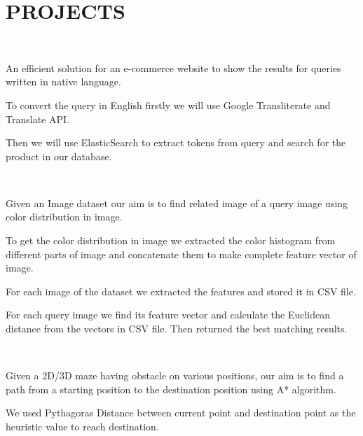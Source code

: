 \documentclass[]{deedy-resume-openfont}
\begin{document}
\begin{minipage}[t]{0.66\textwidth} 


\section{PROJECTS}
\sectionsep
{}\\
\vspace{\topsep} %
\sectionsep
\begin{tightemize}
\item \textmd{An efficient solution for an e-commerce website to show the results for queries written in native language.}
\item \textmd{To convert the query in English firstly we will use Google Transliterate and Translate API.}
\item \textmd{Then we will use ElasticSearch to extract tokens from query and search for the product in our database.}
\end{tightemize}
\sectionsep
\sectionsep
\sectionsep


\\
\vspace{\topsep} %
\begin{tightemize}
\item \textmd{Given an Image dataset our aim is to find related image of a query image using  color distribution in image.}
\item \textmd{To get the color distribution in image we extracted the color histogram from different parts of image and concatenate them to make complete feature vector of image.}
\item \textmd{For each image of the dataset we extracted the features and stored it in CSV file.}
\item \textmd{For each query image we find its feature vector and calculate the Euclidean distance from the vectors in CSV file. Then returned the best matching results.}
\end{tightemize}
\sectionsep
\sectionsep
\sectionsep
{}\\
\vspace{\topsep} %
\begin{tightemize}
\item \textmd{Given a 2D/3D maze having obstacle on various positions, our aim is to find a path from a starting position to the destination position using A* algorithm.}
\item \textmd{We used Pythagoras Distance between current point and destination point as the heuristic value to reach destination.}
\end{tightemize}
\sectionsep
\sectionsep


\end{minipage}
\end{document}
